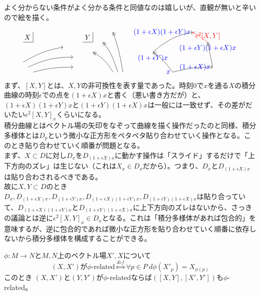 よく分からない条件がよく分かる条件と同値なのは嬉しいが、直観が無いと辛いので絵を描く。
\[\begin{tikzpicture}
    \draw (0.5,1.5)--(1,1.5)node[above left]{$X$}--(1,2);
    
    \draw[->] (0.5,0.5) to [out=30,in=-170] (2.5,1.25);
    \draw[->] (0.75,0.25) to [out=25,in=-180] (3,0.75);
    \draw[->] (1,0) to [out=15,in=-180] (3,0.25);
    
    \draw (3.5,1.5)--(4,1.5)node[above left]{$Y$}--(4,2);
    
    \draw[<<-] (5,2) to [out=-70,in=100] (5.5,0);
    \draw[<<-] (4.5,1.5) to [out=-50,in=110] (5.25,0);
    \draw[<<-] (4,1) to [out=-30,in=120] (5,0);
    
    \draw[->>] (8,0)node[blue,left]{$x$} to [out=130,in=-30] (7,1)node[blue,below]{$(1+\epsilon Y)x$};
    \draw[->] (8,0) to [out=15,in=-180] (10,0.25)node[blue,left]{$(1+\epsilon X)x$};
    \draw[->>] (10,0.25) to [out=100,in=-80] (9.75,1.5)node[blue,below]{$(1+\epsilon Y)(1+\epsilon X)x$};
    \draw[->] (7,1) to [out=40,in=-170] (9,2)node[blue,left]{$(1+\epsilon X)(1+\epsilon Y)x$};
    \draw[red,->] (9.75,1.5)node[above]{$\epsilon^2[X,Y]$}--(9,2);
\end{tikzpicture}\]
まず、$[X,Y]$とは、$X,Y$の非可換性を表す量であった。時刻0で$x$を通る$X$の積分曲線の時刻$\epsilon$での点を$(1+\epsilon X)x$と書く（悪い書き方だが）と、$(1+\epsilon X)(1+\epsilon Y)x$と$(1+\epsilon Y)(1+\epsilon X)x$は一般には一致せず、その差がだいたい$\epsilon^2[X,Y]_x$くらいになる。\\
積分曲線とはベクトル場の矢印をなぞって曲線を描く操作だったのと同様、積分多様体とは$D_p$という微小な正方形をペタペタ貼り合わせていく操作となる。このとき貼り合わせていく順番が問題となる。\\
まず、$X\subset D$に対し$D_x$を$D_{(1+\epsilon X)x}$に動かす操作は「スライド」するだけで「上下方向のズレ」は生じない（これは$X_x\in D_x$だから）。つまり、$D_x$と$D_{(1+\epsilon X)x}$は貼り合わされるべきである。\\
故に$X,Y\subset D$のとき$D_x,D_{(1+\epsilon X)x},D_{(1+\epsilon Y)x},D_{(1+\epsilon X)(1+\epsilon Y)x},D_{(1+\epsilon Y)(1+\epsilon X)x}$は貼り合っていて、$D_{(1+\epsilon X)(1+\epsilon Y)x}$と$D_{(1+\epsilon Y)(1+\epsilon X)x}$に上下方向のズレはないから、さっきの議論とは逆に$\epsilon^2[X,Y]_x\in D_x$となる。これは「積分多様体があれば包合的」を意味するが、逆に包合的であれば微小な正方形を貼り合わせていく順番に依存しないから積分多様体を構成することができる。
\begin{lem}\label{lem:121}
    $\phi:M\to N$と$M,N$上のベクトル場$X',X$について
    \[(X,X')\text{が}\phi\text{-related}\overset{def}{\iff}\forall p\in P\ d\phi(X'_p)=X_{\phi(p)}\]
    このとき $(X,X')$と$(Y,Y')$が$\phi$-relatedならば$([X,Y],[X',Y'])$も$\phi$-related。
\end{lem}
